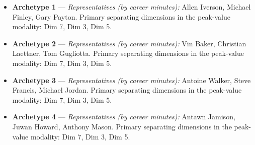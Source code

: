 \begin{itemize}
\item \textbf{Archetype 1} --- \emph{Representatives (by career minutes):} Allen Iverson, Michael Finley, Gary Payton. Primary separating dimensions in the peak-value modality: Dim 7, Dim 3, Dim 5.
\item \textbf{Archetype 2} --- \emph{Representatives (by career minutes):} Vin Baker, Christian Laettner, Tom Gugliotta. Primary separating dimensions in the peak-value modality: Dim 7, Dim 3, Dim 5.
\item \textbf{Archetype 3} --- \emph{Representatives (by career minutes):} Antoine Walker, Steve Francis, Michael Jordan. Primary separating dimensions in the peak-value modality: Dim 7, Dim 3, Dim 5.
\item \textbf{Archetype 4} --- \emph{Representatives (by career minutes):} Antawn Jamison, Juwan Howard, Anthony Mason. Primary separating dimensions in the peak-value modality: Dim 7, Dim 3, Dim 5.
\end{itemize}
